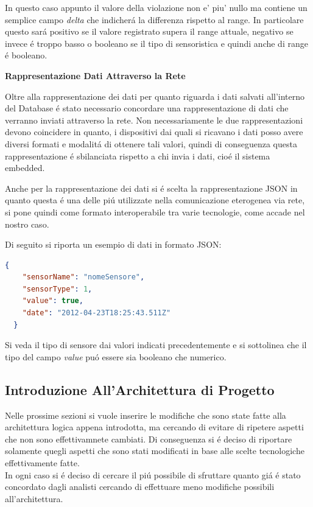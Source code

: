 In questo caso appunto il valore della violazione non e' piu' nullo ma contiene un semplice campo \textit{delta} che indicher\'a la differenza rispetto al range. In particolare questo sar\'a positivo se il valore registrato supera il range attuale, negativo se invece \'e troppo basso o booleano se il tipo di sensoristica e quindi anche di range \'e booleano.

\begin{center}
  \textbf{Rappresentazione Dati Attraverso la Rete}
\end{center}

Oltre alla rappresentazione dei dati per quanto riguarda i dati salvati all'interno del Database \'e stato necessario concordare una rappresentazione di dati che verranno inviati attraverso la rete. Non necessariamente le due rappresentazioni devono coincidere in quanto, i dispositivi dai quali si ricavano i dati posso avere diversi formati e modalit\'a di ottenere tali valori, quindi di conseguenza questa rappresentazione \'e sbilanciata rispetto a chi invia i dati, cio\'e il sistema embedded.

Anche per la rappresentazione dei dati si \'e scelta la rappresentazione JSON in quanto questa \'e una delle pi\'u utilizzate nella comunicazione eterogenea via rete, si pone quindi come formato interoperabile tra varie tecnologie, come accade nel nostro caso.

Di seguito si riporta un esempio di dati in formato JSON:

\begin{lstlisting}[language=json]
  {
    "sensorName": "nomeSensore",
    "sensorType": 1,
    "value": true,
    "date": "2012-04-23T18:25:43.511Z"
  }
\end{lstlisting}

Si veda il tipo di sensore dai valori indicati precedentemente e si sottolinea che il tipo del campo \textit{value} pu\'o essere sia booleano che numerico.

\subsection{Introduzione All'Architettura di Progetto}

Nelle prossime sezioni si vuole inserire le modifiche che sono state fatte alla architettura logica appena introdotta, ma cercando di evitare di ripetere aspetti che non sono effettivamnete cambiati. Di conseguenza si \'e deciso di riportare solamente quegli aspetti che sono stati modificati in base alle scelte tecnologiche effettivamente fatte.\\
In ogni caso si \'e deciso di cercare il pi\'u possibile di sfruttare quanto gi\'a \'e stato concordato dagli analisti cercando di effettuare meno modifiche possibili all'architettura.

